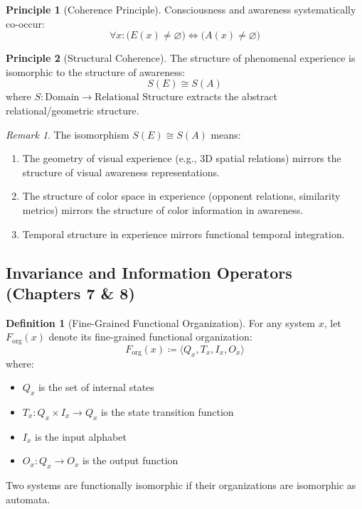 \documentclass[11pt,a4paper]{article}
\theoremstyle{definition}
\newtheorem{definition}{Definition}[section]
\newtheorem{principle}{Principle}[section]
\theoremstyle{plain}
\theoremstyle{remark}
\newtheorem{remark}{Remark}[section]
\newcommand{\Forg}{F_{\text{org}}}
\begin{document}
\begin{principle}[Coherence Principle]\label{prin:coherence}
Consciousness and awareness systematically co-occur:
\begin{equation}
\forall x: \big( E(x) \neq \varnothing \big) \Leftrightarrow \big( A(x) \neq \varnothing \big)
\end{equation}
\end{principle}

\begin{principle}[Structural Coherence]\label{prin:structural_coherence}
The structure of phenomenal experience is isomorphic to the structure of awareness:
\begin{equation}
\boxed{S(E) \cong S(A)}
\end{equation}
where $S: \text{Domain} \to \text{Relational Structure}$ extracts the abstract relational/geometric structure.
\end{principle}

\begin{remark}
The isomorphism $S(E) \cong S(A)$ means:
\begin{enumerate}[nosep]
    \item The geometry of visual experience (e.g., 3D spatial relations) mirrors the structure of visual awareness representations.
    \item The structure of color space in experience (opponent relations, similarity metrics) mirrors the structure of color information in awareness.
    \item Temporal structure in experience mirrors functional temporal integration.
\end{enumerate}
\end{remark}

\subsection{Invariance and Information Operators (Chapters 7 \& 8)}

\begin{definition}[Fine-Grained Functional Organization]
For any system $x$, let $\Forg(x)$ denote its fine-grained functional organization:
\begin{equation}
\Forg(x) \coloneqq \langle Q_x, T_x, I_x, O_x \rangle
\end{equation}
where:
\begin{itemize}[nosep]
    \item $Q_x$ is the set of internal states
    \item $T_x: Q_x \times I_x \to Q_x$ is the state transition function
    \item $I_x$ is the input alphabet
    \item $O_x: Q_x \to O_x$ is the output function
\end{itemize}
Two systems are functionally isomorphic if their organizations are isomorphic as automata.
\end{definition}
\end{document}
